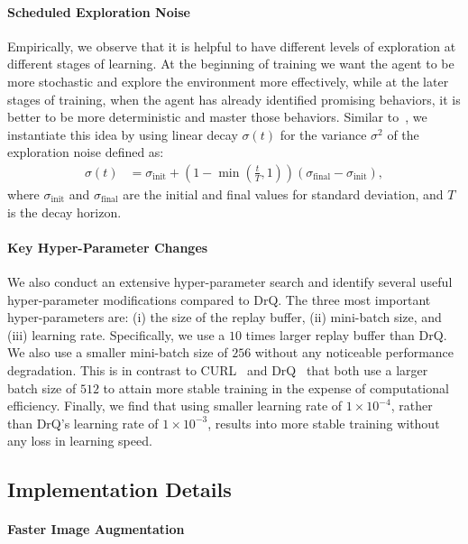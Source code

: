 \paragraph{Scheduled Exploration Noise}
Empirically, we observe that it is helpful to have different levels of exploration at different stages of learning. At the beginning of training we want the agent to be more stochastic and explore the environment more effectively, while at the later stages of training, when the agent has already identified promising behaviors, it is better to be more deterministic and master those behaviors. Similar to~\cite{amos2020modelbased}, we instantiate this idea by using linear decay $\sigma(t)$ for the variance $\sigma^2$ of the exploration noise defined as:
\begin{align}
    \sigma(t) &= \sigma_{\mathrm{init}} + (1 - \min (\frac{t}{T}, 1)) (\sigma_{\mathrm{final}} - \sigma_{\mathrm{init}}),
    \label{eq:decay}
\end{align}
where $\sigma_{\mathrm{init}}$ and  $\sigma_{\mathrm{final}}$ are the initial and final values for standard deviation, and $T$ is the decay horizon.
\paragraph{Key Hyper-Parameter Changes}
We also conduct an extensive hyper-parameter search and identify several useful hyper-parameter modifications compared to DrQ. The three most important hyper-parameters are: (i) the size of the replay buffer, (ii) mini-batch size, and (iii) learning rate. Specifically, we use a $10$ times larger replay buffer than DrQ. We also use a smaller mini-batch size of $256$ without any noticeable performance degradation. This is in contrast to CURL~\citep{srinivas2020curl} and DrQ~\citep{yarats2021image} that both use a larger batch size of $512$ to attain more stable training in the expense of computational efficiency. Finally, we find that using smaller learning rate of $1\times 10^{-4}$, rather than DrQ's learning rate of $1\times 10^{-3}$, results into more stable training without any loss in learning speed.



\subsection{Implementation Details}
\label{section:code_details}

\paragraph{Faster Image Augmentation}

